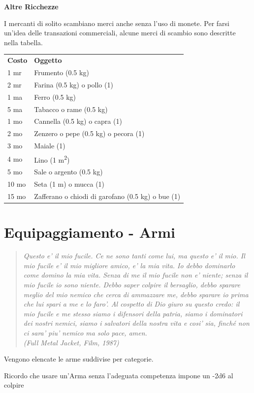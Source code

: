 \documentclass[a4paper,11pt,twoside,openany]{book}
\begin{document}
{\bigskip

\textbf{Altre Ricchezze}

I mercanti di solito scambiano merci anche senza l'uso di monete.
Per farsi un'idea delle transazioni commerciali, alcune merci di scambio sono descritte nella tabella.

\bigskip

\begin{tabular}{ll}
\toprule
\textbf{Costo} & \textbf{Oggetto}\tabularnewline
1 mr & Frumento (0.5 kg)\tabularnewline
2 mr & Farina (0.5 kg) o pollo (1)\tabularnewline
1 ma & Ferro (0.5 kg)\tabularnewline
5 ma & Tabacco o rame (0.5 kg)\tabularnewline
1 mo & Cannella (0.5 kg) o capra (1)\tabularnewline
2 mo & Zenzero o pepe (0.5 kg) o pecora (1)\tabularnewline
3 mo & Maiale (1)\tabularnewline
4 mo & Lino (1 m\textsuperscript{2})\tabularnewline
5 mo & Sale o argento (0.5 kg)\tabularnewline
10 mo & Seta (1 m) o mucca (1)\tabularnewline
15 mo & Zafferano o chiodi di garofano (0.5 kg) o bue (1)\tabularnewline
\end{tabular}

\pagebreak

\section{Equipaggiamento - Armi}

\label{equipaggiamento---armi}
\begin{quote}\textit{
Questo e' il mio fucile. Ce ne sono tanti come lui, ma questo e' il mio. Il mio fucile e' il mio migliore amico, e' la mia vita. Io debbo dominarlo come domino la mia vita. Senza di me il mio fucile non e' niente; senza il mio fucile io sono niente. Debbo saper colpire il bersaglio, debbo sparare meglio del mio nemico che cerca di ammazzare me, debbo sparare io prima che lui spari a me e lo faro'. Al cospetto di Dio giuro su questo credo: il mio fucile e me stesso siamo i difensori della patria, siamo i dominatori dei nostri nemici, siamo i salvatori della nostra vita e cosi' sia, finché non ci sara' piu' nemico ma solo pace, amen.
\\
(Full Metal Jacket, Film, 1987)
}\end{quote}

Vengono elencate le arme suddivise per categorie.

Ricordo che usare un'Arma senza l'adeguata competenza impone un -2d6 al colpire

}
\end{document}
